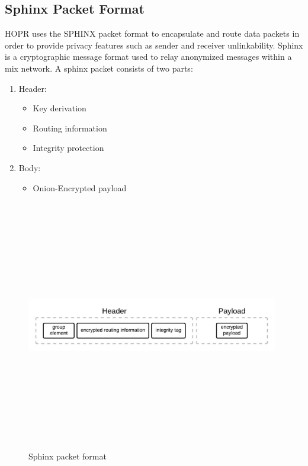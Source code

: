 \subsection{Sphinx Packet Format}

HOPR uses the SPHINX packet format to encapsulate and route data packets in order to provide privacy features such as sender and receiver unlinkability.
Sphinx is a cryptographic message format used to relay anonymized messages within a mix network. A sphinx packet consists of two parts:

\begin{enumerate}
\item Header:
\begin{itemize}
\item Key derivation
\item Routing information
\item Integrity protection
\end{itemize}
\item Body:
\begin{itemize}
\item Onion-Encrypted payload
\end{itemize}
\end{enumerate}
\begin{figure}[H]
    \centering
    \includegraphics[width=11cm,height=11cm,keepaspectratio]{../whitepaper/images/sphinx.jpeg}
    \caption{Sphinx packet format}
    \label{fig:Sphinx packet format}
\end{figure}
